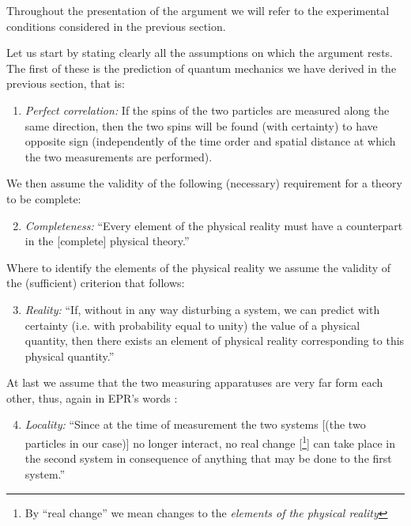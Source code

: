 \begin{note}
Throughout the presentation of the argument we will refer to the experimental conditions considered in the previous section.
\end{note}

Let us start by stating clearly all the assumptions on which the argument rests. The first of these is the prediction of quantum mechanics we have derived in the previous section, that is:
\begin{enumerate}
  \renewcommand{\theenumi}{\alph{enumi}}
  \renewcommand{\labelenumi}{(\theenumi)}
\item \label{itm:epr-perfect-correlation} \textit{Perfect correlation:} If the spins of the two particles are measured along the same direction, then the two spins will be found (with certainty) to have opposite sign (independently of the time order and spatial distance at which the two measurements are performed).
\end{enumerate}
We then assume the validity of the following (necessary) requirement for a theory to be complete:
\begin{enumerate}
  \setcounter{enumi}{1}
  \renewcommand{\theenumi}{\alph{enumi}}
  \renewcommand{\labelenumi}{(\theenumi)}
\item \label{itm:epr-completeness} \textit{Completeness:} ``Every element of the physical reality must have a counterpart in the [complete] physical theory.'' \cite{PhysRev.47.777}
\end{enumerate}
Where to identify the elements of the physical reality we assume the validity of the (sufficient) criterion that follows:
\begin{enumerate}
  \setcounter{enumi}{2}
  \renewcommand{\theenumi}{\alph{enumi}}
  \renewcommand{\labelenumi}{(\theenumi)}
\item \label{itm:epr-reality} \textit{Reality:} ``If, without in any way disturbing a system, we can predict with certainty (i.e. with probability equal to unity) the value of a physical quantity, then there exists an element of physical reality corresponding to this physical quantity.'' \cite{PhysRev.47.777}
\end{enumerate}
At last we assume that the two measuring apparatuses are very far form each other, thus, again in EPR's words \cite{PhysRev.47.777}:
\begin{enumerate}
  \setcounter{enumi}{3}
  \renewcommand{\theenumi}{\alph{enumi}}
  \renewcommand{\labelenumi}{(\theenumi)}
\item \label{itm:epr-locality} \textit{Locality:} ``Since at the time of measurement the two systems [(the two particles in our case)] no longer interact, no real change [\footnote{By ``real change'' we mean changes to the \textit{elements of the physical reality}}] can take place in the second system in consequence of anything that may be done to the first system.''
\end{enumerate}

